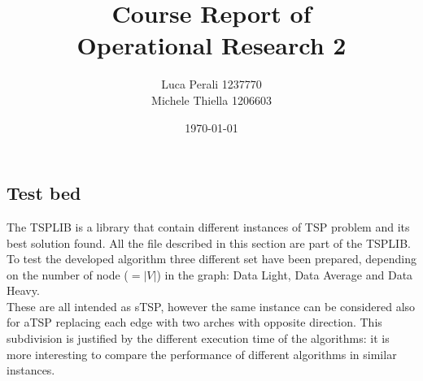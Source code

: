 \documentclass[11pt, english, openany]{report}
\title{Course Report of \\ Operational Research 2}
\author{Luca Perali 1237770 \\ Michele Thiella 1206603}
\date{\today}
\begin{document}

	
	

	\tableofcontents{}
	\clearpage

	
	
	
	
	
	
	
	
	\clearpage
	
	\begin{appendices}
		\chapter{Test bed} \label{sec:testset}
		The TSPLIB \cite{TSPLIB} is a library that contain different instances of TSP problem and its best solution found. All the file described in this section are part of the TSPLIB. To test the developed algorithm three different set have been prepared, depending on the number of node ($=|V|$) in the graph: Data Light, Data Average and Data Heavy.\\
		These are all intended as sTSP, however the same instance can be considered also for aTSP replacing each edge with two arches with opposite direction. This subdivision is justified by the different execution time of the algorithms: it is more interesting to compare the performance of different algorithms in similar instances.\\
		

\end{appendices}
\end{document}
